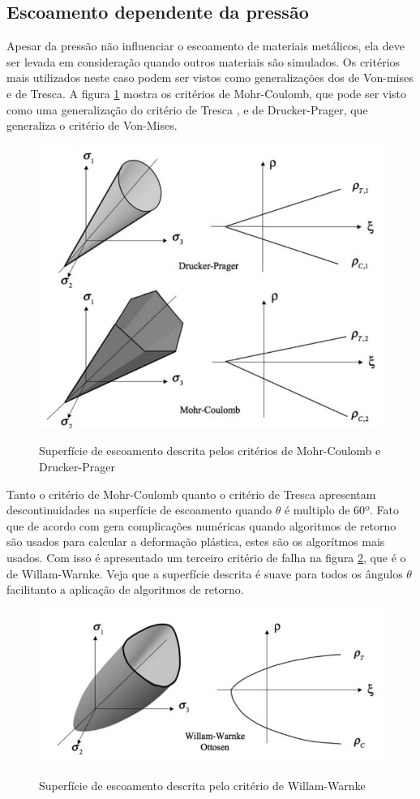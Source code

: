\subsection{Escoamento dependente da pressão}

Apesar da pressão não influenciar o escoamento de materiais metálicos, ela deve ser levada em consideração quando outros materiais são simulados. Os critérios mais utilizados neste caso podem ser vistos como generalizações dos de Von-mises e de Tresca. A figura \ref{fig:mohrDrucker} mostra os critérios de Mohr-Coulomb, que pode ser visto como uma generalização do critério de Tresca , e de Drucker-Prager, que generaliza o critério de Von-Mises.

\begin{figure}
    \centering
    \caption{Superfície de escoamento descrita pelos critérios de Mohr-Coulomb e Drucker-Prager}
    \includegraphics[width=0.7\linewidth]{images/tmohrdrucker.png}
    \label{fig:mohrDrucker}
\end{figure}

Tanto o critério de Mohr-Coulomb quanto o critério de Tresca apresentam descontinuidades na superfície de escoamento quando $\theta$ é multiplo de $ 60º $. Fato que de acordo com  \cite{hiermaier_2008} gera complicações numéricas quando algoritmos de retorno são usados para calcular a deformação plástica, estes são os algorítmos mais usados. Com isso é apresentado um terceiro critério de falha na figura \ref{fig:Willamwarnke}, que é o de Willam-Warnke. Veja que a superfície descrita é suave para todos os ângulos $\theta$ facilitanto a aplicação de algoritmos de retorno. 

\begin{figure}
    \centering
    \caption{Superfície de escoamento descrita pelo critério de Willam-Warnke}
    \includegraphics[width=0.7\linewidth]{images/willianwarnke.png} 
    \label{fig:Willamwarnke}
\end{figure}

